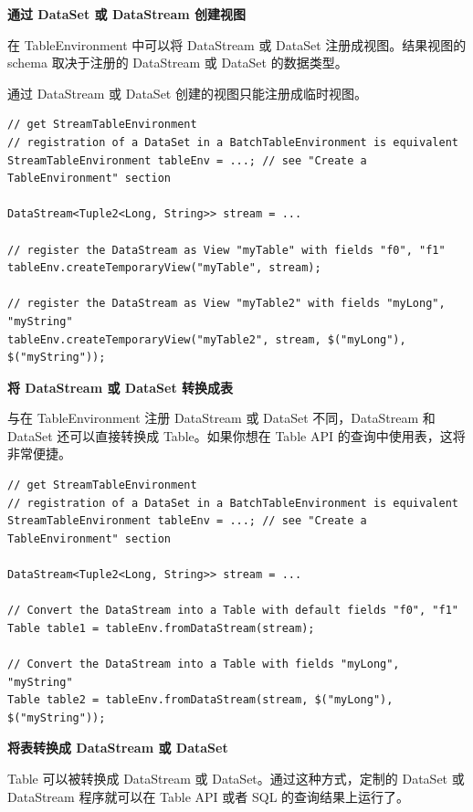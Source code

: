 \documentclass[cn,11pt,chinese]{elegantbook}
\begin{document}
\textbf{通过 DataSet 或 DataStream 创建视图}

在 TableEnvironment 中可以将 DataStream 或 DataSet 注册成视图。结果视图的 schema 取决于注册的 DataStream 或 DataSet 的数据类型。

\begin{note}
    通过 DataStream 或 DataSet 创建的视图只能注册成临时视图。
\end{note}

\begin{verbatim}
// get StreamTableEnvironment
// registration of a DataSet in a BatchTableEnvironment is equivalent
StreamTableEnvironment tableEnv = ...; // see "Create a TableEnvironment" section

DataStream<Tuple2<Long, String>> stream = ...

// register the DataStream as View "myTable" with fields "f0", "f1"
tableEnv.createTemporaryView("myTable", stream);

// register the DataStream as View "myTable2" with fields "myLong", "myString"
tableEnv.createTemporaryView("myTable2", stream, $("myLong"), $("myString"));
\end{verbatim}

\textbf{将 DataStream 或 DataSet 转换成表}

与在 TableEnvironment 注册 DataStream 或 DataSet 不同，DataStream 和 DataSet 还可以直接转换成 Table。如果你想在 Table API 的查询中使用表，这将非常便捷。

\begin{verbatim}
// get StreamTableEnvironment
// registration of a DataSet in a BatchTableEnvironment is equivalent
StreamTableEnvironment tableEnv = ...; // see "Create a TableEnvironment" section

DataStream<Tuple2<Long, String>> stream = ...

// Convert the DataStream into a Table with default fields "f0", "f1"
Table table1 = tableEnv.fromDataStream(stream);

// Convert the DataStream into a Table with fields "myLong", "myString"
Table table2 = tableEnv.fromDataStream(stream, $("myLong"), $("myString"));
\end{verbatim}

\textbf{将表转换成 DataStream 或 DataSet}

Table 可以被转换成 DataStream 或 DataSet。通过这种方式，定制的 DataSet 或 DataStream 程序就可以在 Table API 或者 SQL 的查询结果上运行了。
\end{document}
